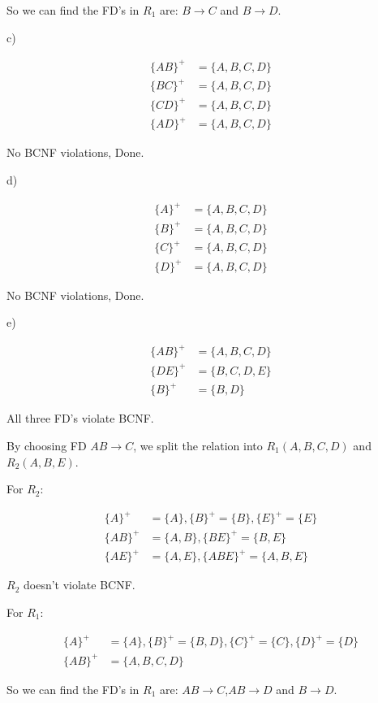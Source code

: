 \documentclass[../../main.tex]{subfiles}
\begin{document}
So we can find the FD's in $R_{1}$ are: $B \to C$ and $B \to D$.

c)

\begin{align*}
  \{AB\}^{+} &= \{A,B,C,D\} \\
  \{BC\}^{+} &= \{A,B,C,D\} \\
  \{CD\}^{+} &= \{A,B,C,D\} \\
  \{AD\}^{+} &= \{A,B,C,D\}
\end{align*}

No BCNF violations, Done.

d)

\begin{align*}
  \{A\}^{+} &= \{A,B,C,D\} \\
  \{B\}^{+} &= \{A,B,C,D\} \\
  \{C\}^{+} &= \{A,B,C,D\} \\
  \{D\}^{+} &= \{A,B,C,D\}
\end{align*}

No BCNF violations, Done.

e)

\begin{align*}
  \{AB\}^{+} &= \{A,B,C,D\} \\
  \{DE\}^{+} &= \{B,C,D,E\} \\
  \{B\}^{+}  &= \{B,D\}
\end{align*}

All three FD's violate BCNF.

By choosing FD $AB \to C$, we split the relation into
$R_{1}(A,B,C,D)$ and $R_{2}(A,B,E)$.

For $R_{2}$:

\begin{align*}
  \{A\}^+ &= \{A\}, \{B\}^+ = \{B\}, \{E\}^+ = \{E\} \\
  \{AB\}^+ &= \{A, B\}, \{BE\}^+ = \{B,E\} \\
  \{AE\}^+ &= \{A, E\}, \{ABE\}^+ = \{A, B, E\}
\end{align*}

$R_{2}$ doesn't violate BCNF.

For $R_{1}$:

\begin{align*}
  \{A\}^+ &= \{A\}, \{B\}^+ = \{B, D\}, 
  \{C\}^+ = \{C\}, \{D\}^+ = \{D\} \\
  \{AB\}^+ &= \{A,B,C,D\}
\end{align*}

So we can find the FD's in $R_{1}$ are: $AB \to C$,$AB \to D$
and $B \to D$.
\end{document}
